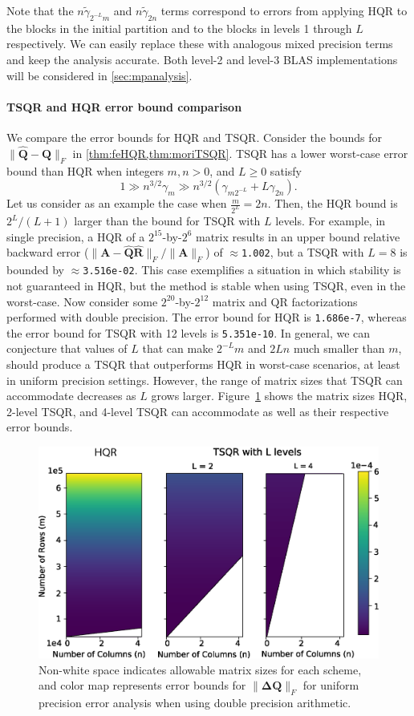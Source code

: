 \documentclass[review,onefignum,onetabnum]{siamart190516}
\newcommand{\bb}[1]{\mathbf{#1}}
\begin{document}
Note that the $n\tilde{\gamma}_{2^{-L}m}$ and $n\tilde{\gamma}_{ 2n}$ terms correspond to errors from applying HQR to the blocks in the initial partition and to the blocks in levels 1 through $L$ respectively.
We can easily replace these with analogous mixed precision terms and keep the analysis accurate.
Both level-2 and level-3 BLAS implementations will be considered in \cref{sec:mpanalysis}.
\paragraph{TSQR and HQR error bound comparison}
We compare the error bounds for HQR and TSQR. 
Consider the bounds for $\|\hat{\bb{Q}}-\bb{Q}\|_F$ in \cref{thm:feHQR,thm:moriTSQR}.
TSQR has a lower worst-case error bound than HQR when integers $m, n > 0$, and $L\geq0$ satisfy
\begin{equation*}
1\gg n^{3/2}\gamma_m \gg n^{3/2}(\gamma_{m2^{-L}}+L\gamma_{2n}).
\end{equation*}
Let us consider as an example the case when $\frac{m}{2^L}=2n$.
Then, the HQR bound is $2^L/(L+1)$ larger than the bound for TSQR with $L$ levels.
For example, in single precision, a HQR of a $2^{15}$-by-$2^6$ matrix results in an upper bound relative backward error ($\|\bb{A}-\hat{\bb{Q}}\hat{\bb{R}}\|_F/\|\bb{A}\|_F$) of $\approx${\tt1.002}, but a TSQR with $L=8$ is bounded by $\approx${\tt 3.516e-02}. 
This case exemplifies a situation in which stability is not guaranteed in HQR, but the method is stable when using TSQR, even in the worst-case. 
Now consider some $2^{20}$-by-$2^{12}$ matrix and QR factorizations performed with double precision.
The error bound for HQR is {\tt 1.686e-7}, whereas the error bound for TSQR with 12 levels is {\tt 5.351e-10}.
In general, we can conjecture that values of $L$ that can make $2^{-L}m$ and $2Ln$ much smaller than $m$, should produce a TSQR that outperforms HQR in worst-case scenarios, at least in uniform precision settings.
However, the range of matrix sizes that TSQR can accommodate decreases as $L$ grows larger.
Figure~\ref{fig:paramspace} shows the matrix sizes HQR, 2-level TSQR, and 4-level TSQR can accommodate as well as their respective error bounds.\par
\begin{figure}
	\centering
	\includegraphics[width=.45\textwidth]{./figures/paramspace.png}
	\caption{\label{fig:paramspace} Non-white space indicates allowable matrix sizes for each scheme, and color map represents error bounds for $\|\bb{\Delta Q}\|_F$ for uniform precision error analysis when using double precision arithmetic.}
	\vspace{-10pt}	
\end{figure}
\end{document}
